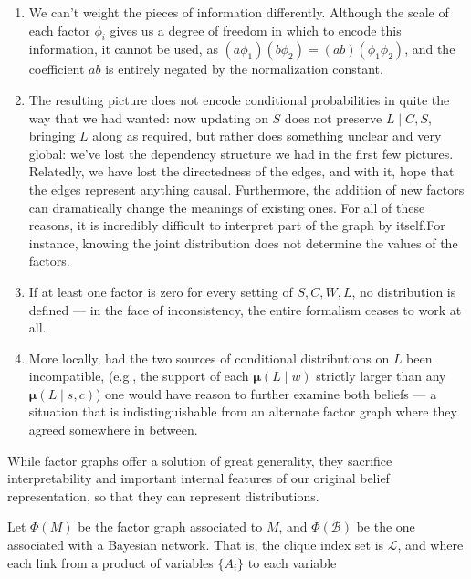 \documentclass{article}
\newcommand\bmu{\boldsymbol{\mu}}
\begin{document}
	\begin{enumerate}
		\item We can't weight the pieces of information differently. Although the scale of each factor $\phi_i$ gives us a degree of freedom in which to encode this information, it cannot be used, as $(a\phi_1) (b\phi_2) = (ab) (\phi_1\phi_2)$, and the coefficient $ab$ is entirely negated by the normalization constant.			

		\item The resulting picture does not encode conditional probabilities in quite the way that we had wanted: now updating on $S$ does not preserve $L\mid C,S$, bringing $L$ along as required, but rather does something unclear and very global: we've lost the dependency structure we had in the first few pictures. Relatedly, we have lost the directedness of the edges, and with it, hope that the edges represent anything causal. Furthermore, the addition of new factors can dramatically change the meanings of existing ones. 
		For all of these reasons, it is incredibly difficult to interpret part of the graph by itself.For instance, knowing the joint distribution does not determine the values of the factors.
		
		\item If at least one factor is zero for every setting of $S,C,W,L$, no distribution is defined --- in the face of inconsistency, the entire formalism ceases to work at all.
		
		\item More locally, had the two sources of conditional distributions on $L$ been incompatible, (e.g., the support of each $\bmu(L\mid w)$ strictly larger than any $\bmu(L\mid s,c)$) one would have reason to further examine both beliefs --- a situation that is indistinguishable from an alternate factor graph where they agreed somewhere in between.	
	\end{enumerate}		
	
	
	While factor graphs offer a solution of great generality, they sacrifice interpretability and important internal features of our original belief representation, so that they can represent distributions.
	
	
	
	
	Let $\Phi(M)$ be the factor graph associated to $M$, and $\Phi(\mathcal B)$ be the one associated with a Bayesian network. That is, the clique index set is $\mathcal L$, and where each link from a product of variables $\{A_i\}$ to 
	each variable 
	
\end{document}
